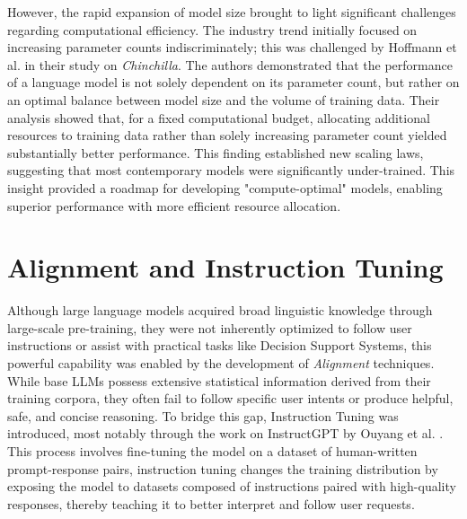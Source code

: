 However, the rapid expansion of model size brought to light significant challenges regarding computational efficiency. The industry trend initially focused on increasing parameter counts indiscriminately; this was challenged by Hoffmann et al. \cite{hoffmann2022training} in their study on \textit{Chinchilla}. The authors demonstrated that the performance of a language model is not solely dependent on its parameter count, but rather on an optimal balance between model size and the volume of training data. Their analysis showed that, for a fixed computational budget, allocating additional resources to training data rather than solely increasing parameter count yielded substantially better performance. This finding established new scaling laws, suggesting that most contemporary models were significantly under-trained. This insight provided a roadmap for developing "compute-optimal" models, enabling superior performance with more efficient resource allocation.



\section{Alignment and Instruction Tuning}
Although large language models acquired broad linguistic knowledge through large-scale pre-training, they were not inherently optimized to follow user instructions or assist with practical tasks like Decision Support Systems, this powerful capability was enabled by the development of \textit{Alignment} techniques. While base LLMs possess extensive statistical information derived from their training corpora, they often fail to follow specific user intents or produce helpful, safe, and concise reasoning. To bridge this gap, Instruction Tuning was introduced, most notably through the work on InstructGPT by Ouyang et al. \cite{ouyang2022training}. This process involves fine-tuning the model on a dataset of human-written prompt-response pairs, instruction tuning changes the training distribution by exposing the model to datasets composed of instructions paired with high-quality responses, thereby teaching it to better interpret and follow user requests.

